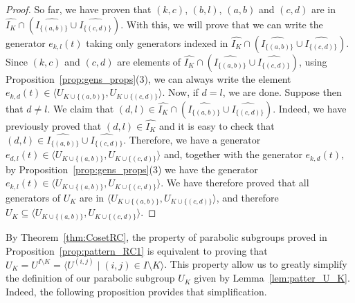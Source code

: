 \documentclass[11pt,letterpaper]{amsart}
\begin{document}
\begin{proof}
So far, we have proven that $(k,c)$, $(b,l)$, $(a,b)$ and $(c,d)$ are in $\widehat{I_K}\cap (\widehat{I_{\{(a,b)\}}}\cup \widehat{I_{\{(c,d)\}}})$. 
With this, we will prove that we can write the generator $e_{k,l}(t)$ taking only generators indexed in $\widehat{I_K}\cap (\widehat{I_{\{(a,b)\}}}\cup \widehat{I_{\{(c,d)\}}})$.
Since $(k,c)$ and $(c,d)$ are elements of $\widehat{I_K}\cap (\widehat{I_{\{(a,b)\}}}\cup \widehat{I_{\{(c,d)\}}})$, using Proposition~\ref{prop:gens_props}(3), we can always write the element $e_{k,d}(t)\in \langle U_{K\cup\{(a,b)\}}, U_{K\cup\{(c,d)\}}\rangle $. 
Now, if $d=l$, we are done. Suppose then that $d\neq l$.
We claim that $(d,l)\in \widehat{I_K}\cap (\widehat{I_{\{(a,b)\}}}\cup \widehat{I_{\{(c,d)\}}})$. Indeed, we have previously proved that $(d,l)\in \widehat{I_K}$ and it is easy to check that $(d,l)\in \widehat{I_{\{(a,b)\}}}\cup \widehat{I_{\{(c,d)\}}}$.
Therefore, we have a generator $e_{d,l}(t)\in \langle U_{K\cup\{(a,b)\}}, U_{K\cup\{(c,d)\}}\rangle$ and, together with the generator $e_{k,d}(t)$, by Proposition~\ref{prop:gens_props}(3) we have the generator $e_{k,l}(t)\in \langle U_{K\cup\{(a,b)\}}, U_{K\cup\{(c,d)\}}\rangle$.
 We have therefore proved that all generators of $U_K$ are in $\langle U_{K\cup\{(a,b)\}} , U_{K\cup\{(c,d)\}}\rangle$, and therefore $U_K\subseteq \langle U_{K\cup\{(a,b)\}} , U_{K\cup\{(c,d)\}}\rangle$.
\end{proof}
 
By Theorem~\ref{thm:CosetRC}, the property of parabolic subgroups proved in Proposition~\ref{prop:pattern_RC1} is equivalent to proving that $U_K = U^{I\setminus K} = \langle U^{(i,j)}\mid (i,j)\in I\setminus K\rangle$.
This property allow us to greatly simplify the definition of our parabolic subgroup $U_K$ given by Lemma~\ref{lem:patter_U_K}. Indeed, the following proposition provides that simplification.
\end{document}

